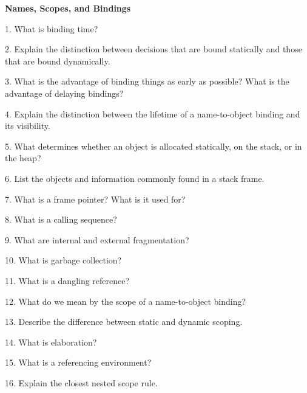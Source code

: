 \centerline{\bf Names, Scopes, and Bindings}

\vskip 1cm

1. What is binding time?

\filbreak
\vskip 1cm

2. Explain the distinction between decisions that are bound statically and those that are bound dynamically.

\filbreak
\vskip 1cm

3. What is the advantage of binding things as early as possible? What is the advantage of delaying bindings?

\filbreak
\vskip 1cm

4. Explain the distinction between the lifetime of a name-to-object binding and its visibility.

\filbreak
\vskip 1cm

5. What determines whether an object is allocated statically, on the stack, or in the heap?

\filbreak
\vskip 1cm

6. List the objects and information commonly found in a stack frame.

\filbreak
\vskip 1cm

7. What is a frame pointer? What is it used for?

\filbreak
\vskip 1cm

8. What is a calling sequence?

\filbreak
\vskip 1cm

9. What are internal and external fragmentation?

\filbreak
\vskip 1cm

10. What is garbage collection?

\filbreak
\vskip 1cm

11. What is a dangling reference?

\filbreak
\vskip 1cm

12. What do we mean by the scope of a name-to-object binding?

\filbreak
\vskip 1cm

13. Describe the difference between static and dynamic scoping.

\filbreak
\vskip 1cm

14. What is elaboration?

\filbreak
\vskip 1cm

15. What is a referencing environment?

\filbreak
\vskip 1cm

16. Explain the closest nested scope rule.

